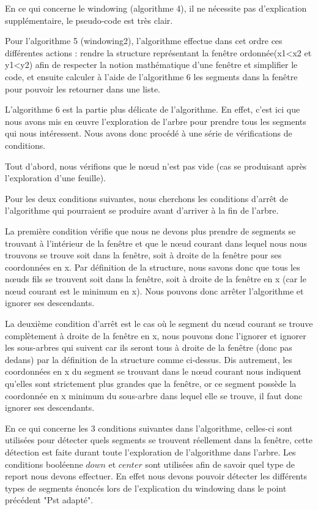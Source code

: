 \documentclass[10pt,a4paper]{article}
\begin{document}
En ce qui concerne le windowing (algorithme 4), il ne nécessite pas d'explication supplémentaire, le pseudo-code est très clair.

Pour l'algorithme 5 (windowing2), l'algorithme effectue dans cet ordre ces différentes actions : rendre la structure représentant la fenêtre ordonnée(x1<x2 et y1<y2) afin de respecter la notion mathématique d'une fenêtre et simplifier le code, et ensuite calculer à l'aide de l'algorithme 6 les segments dans la fenêtre pour pouvoir les retourner dans une liste.

L'algorithme 6 est la partie plus délicate de l'algorithme. En effet, c'est ici que nous avons mis en œuvre l'exploration de l'arbre pour prendre tous les segments qui nous intéressent. Nous avons donc procédé à une série de vérifications de conditions.

Tout d'abord, nous vérifions que le nœud n'est pas vide (cas se produisant après l'exploration d'une feuille).

Pour les deux conditions suivantes, nous cherchons les conditions d'arrêt de l'algorithme qui pourraient se produire avant d'arriver à la fin de l'arbre.

La première condition vérifie que nous ne devons plus prendre de segments se trouvant à l'intérieur de la fenêtre et que le nœud courant dans lequel nous nous trouvons se trouve soit dans la fenêtre, soit à droite de la fenêtre pour ses coordonnées en x. Par définition de la structure, nous savons donc que tous les nœuds fils se trouvent soit dans la fenêtre, soit à droite de la fenêtre en x (car le nœud courant est le minimum en x). Nous pouvons donc arrêter l'algorithme et ignorer ses descendants.

La deuxième condition d'arrêt est le cas où le segment du nœud courant se trouve complètement à droite de la fenêtre en x, nous pouvons donc l'ignorer et ignorer les sous-arbres qui suivent car ils seront tous à droite de la fenêtre (donc pas dedans) par la définition de la structure comme ci-dessus. Dis autrement, les coordonnées en x du segment se trouvant dans le nœud courant nous indiquent qu'elles sont strictement plus grandes que la fenêtre, or ce segment possède la coordonnée en x minimum du sous-arbre dans lequel elle se trouve, il faut donc ignorer ses descendants.

En ce qui concerne les 3 conditions suivantes dans l'algorithme, celles-ci sont utilisées pour détecter quels segments se trouvent réellement dans la fenêtre, cette détection est faite durant toute l'exploration de l'algorithme dans l'arbre. Les conditions booléenne $down$ et $center$ sont utilisées afin de savoir quel type de report nous devons effectuer. En effet nous devons pouvoir détecter les différents types de segments énoncés lors de l'explication du windowing dans le point précédent "Pst adapté".
\end{document}
